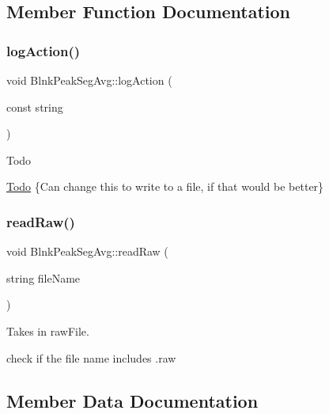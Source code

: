 \subsection{Member Function Documentation}
\mbox{\label{classBlnkPeakSegAvg_ac6acee0554ddea948407e294c7a21eff}} 
\subsubsection{\texorpdfstring{log\+Action()}{logAction()}}
{\footnotesize\ttfamily void Blnk\+Peak\+Seg\+Avg\+::log\+Action (\begin{DoxyParamCaption}\item[{const string}]{ }\end{DoxyParamCaption})}

\begin{DoxyRefDesc}{Todo}
\item[\hyperlink{todo__todo000003}{Todo}]\{Can change this to write to a file, if that would be better\} \end{DoxyRefDesc}
\mbox{\label{classBlnkPeakSegAvg_a34445db61572d19462bfc5f1d647f332}} 
\subsubsection{\texorpdfstring{read\+Raw()}{readRaw()}}
{\footnotesize\ttfamily void Blnk\+Peak\+Seg\+Avg\+::read\+Raw (\begin{DoxyParamCaption}\item[{string}]{file\+Name }\end{DoxyParamCaption})}



Takes in raw\+File. 

check if the file name includes .raw 

\subsection{Member Data Documentation}
\mbox{\label{classBlnkPeakSegAvg_aa968b86e939b44e6b2585ae5dff022b3}} 
